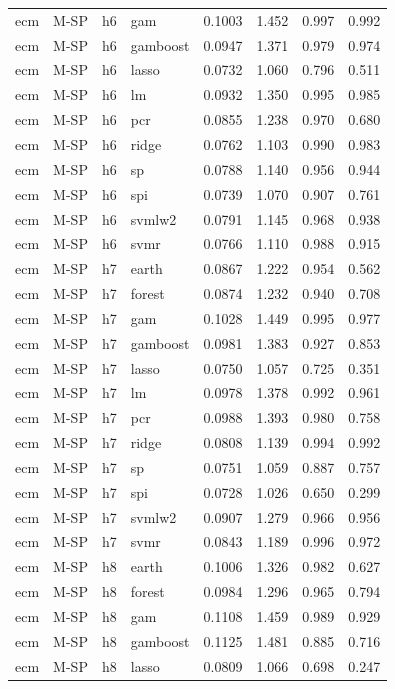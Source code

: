 \begin{ThreePartTable}
\begin{longtable}[t]{llclcccc}
ecm & M-SP & h6 & gam & 0.1003 & 1.452 & 0.997 & 0.992\\
ecm & M-SP & h6 & gamboost & 0.0947 & 1.371 & 0.979 & 0.974\\
ecm & M-SP & h6 & lasso & 0.0732 & 1.060 & 0.796 & 0.511\\
ecm & M-SP & h6 & lm & 0.0932 & 1.350 & 0.995 & 0.985\\
ecm & M-SP & h6 & pcr & 0.0855 & 1.238 & 0.970 & 0.680\\
ecm & M-SP & h6 & ridge & 0.0762 & 1.103 & 0.990 & 0.983\\
ecm & M-SP & h6 & sp & 0.0788 & 1.140 & 0.956 & 0.944\\
ecm & M-SP & h6 & spi & 0.0739 & 1.070 & 0.907 & 0.761\\
ecm & M-SP & h6 & svmlw2 & 0.0791 & 1.145 & 0.968 & 0.938\\
ecm & M-SP & h6 & svmr & 0.0766 & 1.110 & 0.988 & 0.915\\
\addlinespace
ecm & M-SP & h7 & earth & 0.0867 & 1.222 & 0.954 & 0.562\\
ecm & M-SP & h7 & forest & 0.0874 & 1.232 & 0.940 & 0.708\\
ecm & M-SP & h7 & gam & 0.1028 & 1.449 & 0.995 & 0.977\\
ecm & M-SP & h7 & gamboost & 0.0981 & 1.383 & 0.927 & 0.853\\
ecm & M-SP & h7 & lasso & 0.0750 & 1.057 & 0.725 & 0.351\\
ecm & M-SP & h7 & lm & 0.0978 & 1.378 & 0.992 & 0.961\\
ecm & M-SP & h7 & pcr & 0.0988 & 1.393 & 0.980 & 0.758\\
ecm & M-SP & h7 & ridge & 0.0808 & 1.139 & 0.994 & 0.992\\
ecm & M-SP & h7 & sp & 0.0751 & 1.059 & 0.887 & 0.757\\
ecm & M-SP & h7 & spi & 0.0728 & 1.026 & 0.650 & 0.299\\
ecm & M-SP & h7 & svmlw2 & 0.0907 & 1.279 & 0.966 & 0.956\\
ecm & M-SP & h7 & svmr & 0.0843 & 1.189 & 0.996 & 0.972\\
\addlinespace
ecm & M-SP & h8 & earth & 0.1006 & 1.326 & 0.982 & 0.627\\
ecm & M-SP & h8 & forest & 0.0984 & 1.296 & 0.965 & 0.794\\
ecm & M-SP & h8 & gam & 0.1108 & 1.459 & 0.989 & 0.929\\
ecm & M-SP & h8 & gamboost & 0.1125 & 1.481 & 0.885 & 0.716\\
ecm & M-SP & h8 & lasso & 0.0809 & 1.066 & 0.698 & 0.247\\

\end{longtable}
\end{ThreePartTable}

